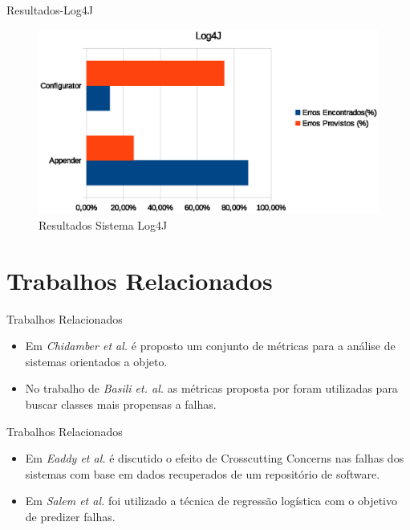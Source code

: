 \documentclass[t,14pt,mathserif]{beamer}
\begin{document}
\begin{frame}{Resultados-Log4J}

\begin{figure}[htbp]
\centering
\includegraphics[width=.80\textwidth]{../img/graph_log4j.eps}
\caption{Resultados Sistema Log4J}
\label{fig:avalicao_log4j}
\end{figure}


\end{frame}
\section{Trabalhos Relacionados}

\begin{frame}{Trabalhos Relacionados}
	\begin{itemize}
	
		\item Em \textit{Chidamber et al.}\cite{chidamber1994metrics} é proposto um conjunto de métricas para a análise de sistemas orientados a objeto.
		\item No trabalho de \textit{Basili et. al.} \cite{basili1996validation} as métricas proposta por \cite{chidamber1994metrics} foram utilizadas para buscar classes mais propensas a falhas.
	\end{itemize}

\end{frame}

\begin{frame}{Trabalhos Relacionados}
	\begin{itemize}
	\item Em \textit{Eaddy et al.} \cite{eaddy2008crosscutting} é discutido o efeito de Crosscutting Concerns nas falhas dos sistemas com base em dados recuperados de um repositório de software.		
	\item Em \textit{Salem et al.}\cite{salem2004prediction} foi utilizado a técnica de regressão logística com o objetivo de predizer falhas.	
	\end{itemize}

\end{frame}
\end{document}
